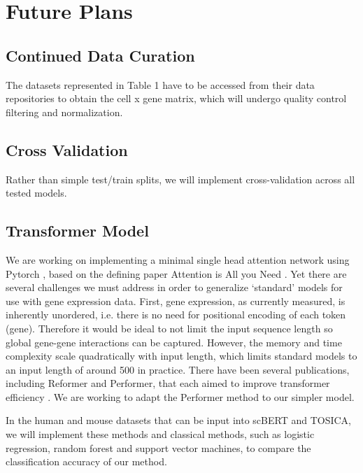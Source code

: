 \documentclass{article}
\begin{document}
\section{Future Plans}

\subsection{Continued Data Curation}

The datasets represented in Table 1 have to be accessed from their data repositories to obtain the cell x gene matrix, which will undergo quality control filtering and normalization. 


\subsection{Cross Validation}
Rather than simple test/train splits, we will implement cross-validation across all tested models. 


\subsection{Transformer Model}

We are working on implementing a minimal single head attention network using Pytorch \cite{paszkePyTorchImperativeStyle2019}, based on the defining paper Attention is All you Need \cite{vaswaniAttentionAllYou2023}. Yet there are several challenges we must address in order to generalize ‘standard’ models for use with gene expression data. First, gene expression, as currently measured, is inherently unordered, i.e. there is no need for positional encoding of each token (gene). Therefore it would be ideal to not limit the input sequence length so global gene-gene interactions can be captured. However, the memory and time complexity scale quadratically  with input length, which limits standard models to an input length of around 500 in practice. There have been several publications, including Reformer and Performer, that each aimed to improve transformer efficiency \cite{katharopoulosTransformersAreRNNs2020, daiTransformerXLAttentiveLanguage2019, meritySingleHeadedAttention2019, choromanskiRethinkingAttentionPerformers2022, kitaevReformerEfficientTransformer2020, vyasFastTransformersClustered2020}. We are working to adapt the Performer method to our simpler model. 

In the human and mouse datasets that can be input into scBERT and TOSICA, we will implement these methods and classical methods, such as logistic regression, random forest and support vector machines, to compare the classification accuracy of our method. 
\end{document}
